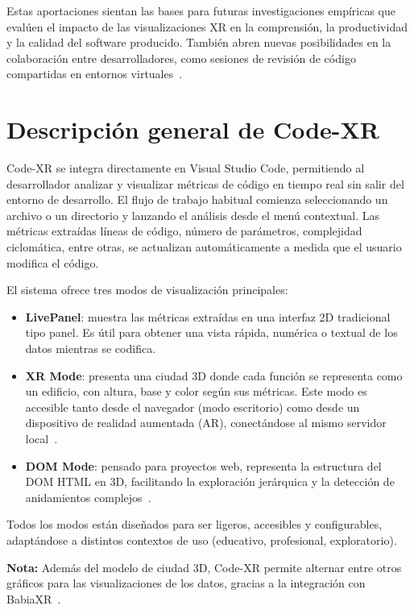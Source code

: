 \documentclass[a4paper, 12pt]{book}
\begin{document}
Estas aportaciones sientan las bases para futuras investigaciones empíricas que evalúen el impacto de las visualizaciones XR en la comprensión, la productividad y la calidad del software producido. También abren nuevas posibilidades en la colaboración entre desarrolladores, como sesiones de revisión de código compartidas en entornos virtuales~\cite{fittkau2015exploring}.

\section{Descripción general de Code-XR}
\label{sec:descripcion-general}

Code-XR se integra directamente en Visual Studio Code, permitiendo al desarrollador analizar y visualizar métricas de código en tiempo real sin salir del entorno de desarrollo. El flujo de trabajo habitual comienza seleccionando un archivo o un directorio y lanzando el análisis desde el menú contextual. Las métricas extraídas líneas de código, número de parámetros, complejidad ciclomática, entre otras, se actualizan automáticamente a medida que el usuario modifica el código.


El sistema ofrece tres modos de visualización principales:

\begin{itemize}
    \item \textbf{LivePanel}: muestra las métricas extraídas en una interfaz 2D tradicional tipo panel. Es útil para obtener una vista rápida, numérica o textual de los datos mientras se codifica.
  \item \textbf{XR Mode}: presenta una ciudad 3D donde cada función se representa como un edificio, con altura, base y color según sus métricas. Este modo es accesible tanto desde el navegador (modo escritorio) como desde un dispositivo de realidad aumentada (AR), conectándose al mismo servidor local~\cite{wettel2007visualizing, fittkau2015exploring}.
    \item \textbf{DOM Mode}: pensado para proyectos web, representa la estructura del DOM HTML en 3D, facilitando la exploración jerárquica y la detección de anidamientos complejos~\cite{moreno2024enhancing}.
\end{itemize}

Todos los modos están diseñados para ser ligeros, accesibles y configurables, adaptándose a distintos contextos de uso (educativo, profesional, exploratorio).

\textbf{Nota:} Además del modelo de ciudad 3D, Code-XR permite alternar entre otros gráficos para las visualizaciones de los datos, gracias a la integración con BabiaXR~\cite{moreno2022babiaxr}.
\end{document}
